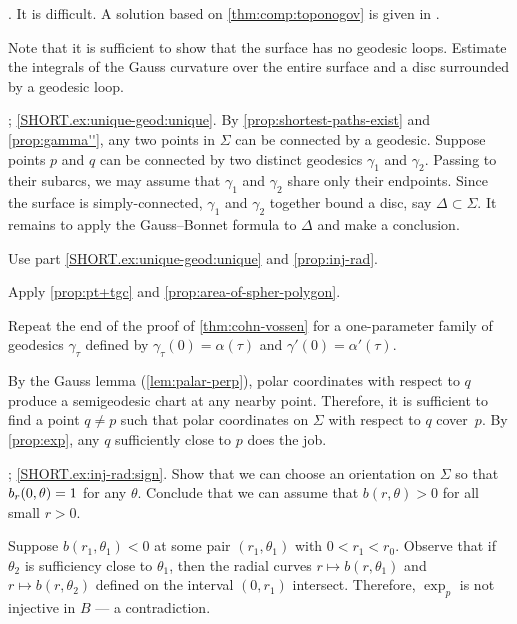 \begin{multicols}{2}
.
It is difficult.
A solution based on \ref{thm:comp:toponogov} is given in \cite{petrunin2021}.

 Note that it is sufficient to show that the surface has no geodesic loops.
Estimate the integrals of the Gauss curvature over the entire surface and a disc surrounded by a geodesic loop.

\parbf{\ref{ex:unique-geod}}; \ref{SHORT.ex:unique-geod:unique}.
By \ref{prop:shortest-paths-exist} and \ref{prop:gamma''}, any two points in $\Sigma$ can be connected by a geodesic.
Suppose points $p$ and $q$ can be connected by two distinct geodesics $\gamma_1$ and $\gamma_2$.
Passing to their subarcs, we may assume that $\gamma_1$ and $\gamma_2$ share only their endpoints.
Since the surface is simply-connected, $\gamma_1$ and $\gamma_2$ together bound a disc, say $\Delta\subset\Sigma$.
It remains to apply the Gauss--Bonnet formula to $\Delta$ and make a conclusion.
 
Use part \ref{SHORT.ex:unique-geod:unique} and \ref{prop:inj-rad}.

Apply \ref{prop:pt+tgc} and \ref{prop:area-of-spher-polygon}.

Repeat the end of the proof of \ref{thm:cohn-vossen} for a one-parameter family of geodesics $\gamma_\tau$ defined by $\gamma_\tau(0)=\alpha(\tau)$ and $\gamma'(0)=\alpha'(\tau)$. 


\setcounter{eqtn}{0}

By the Gauss lemma (\ref{lem:palar-perp}), polar coordinates with respect to $q$ produce a semigeodesic chart at any nearby point.
Therefore, it is sufficient to find a point $q\ne p$ such that polar coordinates on $\Sigma$ with respect to $q$ cover~$p$.
By \ref{prop:exp}, any $q$ sufficiently close to $p$ does the job.

\parbf{\ref{ex:inj-rad}}; \ref{SHORT.ex:inj-rad:sign}.
Show that we can choose an orientation on $\Sigma$ so that $b_r(0,\theta)\z=1$ for any $\theta$.
Conclude that we can assume that $b(r,\theta)>0$ for all small $r>0$.

Suppose $b(r_1,\theta_1)<0$ at some pair $(r_1,\theta_1)$ with $0<r_1<r_0$.
Observe that if $\theta_2$ is sufficiency close to $\theta_1$, then the radial curves $r\mapsto b(r,\theta_1)$ and $r\mapsto b(r,\theta_2)$ defined on the interval $(0,r_1)$ intersect.
Therefore, $\exp_p$ is not injective in $B$ --- a contradiction.


\end{multicols}
